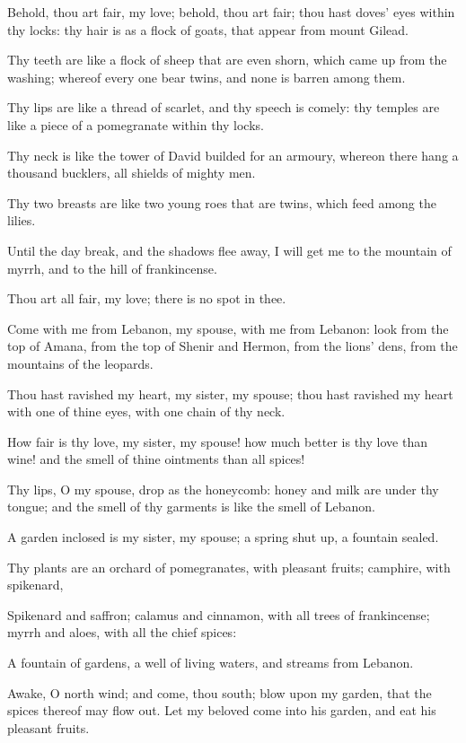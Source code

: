Behold, thou art fair, my love; behold, thou art fair; thou hast doves' eyes within thy locks: thy hair is as a flock of goats, that appear from mount Gilead.

Thy teeth are like a flock of sheep that are even shorn, which came up from the washing; whereof every one bear twins, and none is barren among them.

Thy lips are like a thread of scarlet, and thy speech is comely: thy temples are like a piece of a pomegranate within thy locks.

Thy neck is like the tower of David builded for an armoury, whereon there hang a thousand bucklers, all shields of mighty men.

Thy two breasts are like two young roes that are twins, which feed among the lilies.

Until the day break, and the shadows flee away, I will get me to the mountain of myrrh, and to the hill of frankincense.

Thou art all fair, my love; there is no spot in thee.

Come with me from Lebanon, my spouse, with me from Lebanon: look from the top of Amana, from the top of Shenir and Hermon, from the lions' dens, from the mountains of the leopards.

Thou hast ravished my heart, my sister, my spouse; thou hast ravished my heart with one of thine eyes, with one chain of thy neck.

How fair is thy love, my sister, my spouse! how much better is thy love than wine! and the smell of thine ointments than all spices!

Thy lips, O my spouse, drop as the honeycomb: honey and milk are under thy tongue; and the smell of thy garments is like the smell of Lebanon.

A garden inclosed is my sister, my spouse; a spring shut up, a fountain sealed.

Thy plants are an orchard of pomegranates, with pleasant fruits; camphire, with spikenard,

Spikenard and saffron; calamus and cinnamon, with all trees of frankincense; myrrh and aloes, with all the chief spices:

A fountain of gardens, a well of living waters, and streams from Lebanon.

Awake, O north wind; and come, thou south; blow upon my garden, that the spices thereof may flow out. Let my beloved come into his garden, and eat his pleasant fruits.

